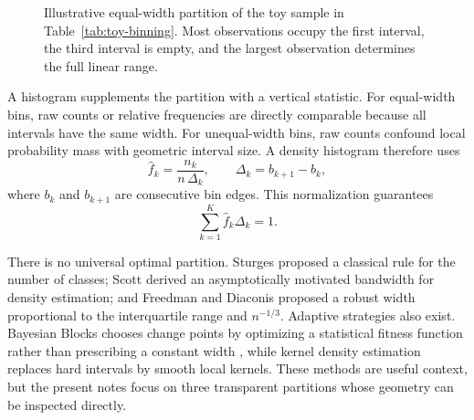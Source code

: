 \begin{figure}[!htbp]
\centering
{}
\caption{Illustrative equal-width partition of the toy sample in Table~\ref{tab:toy-binning}. Most observations occupy the first interval, the third interval is empty, and the largest observation determines the full linear range.}
\label{fig:toy-binning}
\end{figure}

A histogram supplements the partition with a vertical statistic. For equal-width bins, raw counts or relative frequencies are directly comparable because all intervals have the same width. For unequal-width bins, raw counts confound local probability mass with geometric interval size. A density histogram therefore uses
\begin{equation}
 \widehat f_k=\frac{n_k}{n\,\Delta_k},
 \qquad
 \Delta_k=b_{k+1}-b_k,
\label{eq:density-hist}
\end{equation}
where $b_k$ and $b_{k+1}$ are consecutive bin edges. This normalization guarantees
\begin{equation}
 \sum_{k=1}^{K}\widehat f_k\Delta_k=1.
\end{equation}

There is no universal optimal partition. Sturges \cite{Sturges1926} proposed a classical rule for the number of classes; Scott \cite{Scott1979} derived an asymptotically motivated bandwidth for density estimation; and Freedman and Diaconis \cite{FreedmanDiaconis1981} proposed a robust width proportional to the interquartile range and $n^{-1/3}$. Adaptive strategies also exist. Bayesian Blocks chooses change points by optimizing a statistical fitness function rather than prescribing a constant width \cite{ScargleEtAl2013}, while kernel density estimation replaces hard intervals by smooth local kernels. These methods are useful context, but the present notes focus on three transparent partitions whose geometry can be inspected directly.

